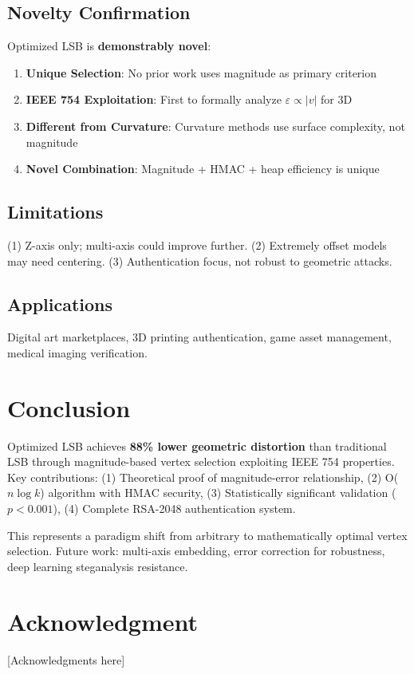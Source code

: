 \documentclass[conference]{IEEEtran}
\begin{document}
\subsection{Novelty Confirmation}
Optimized LSB is \textbf{demonstrably novel}:
\begin{enumerate}
\item \textbf{Unique Selection}: No prior work uses magnitude as primary criterion
\item \textbf{IEEE 754 Exploitation}: First to formally analyze $\varepsilon \propto |v|$ for 3D
\item \textbf{Different from Curvature}: Curvature methods \cite{zhou2019distortion} use surface complexity, not magnitude
\item \textbf{Novel Combination}: Magnitude + HMAC + heap efficiency is unique
\end{enumerate}

\subsection{Limitations}
(1) Z-axis only; multi-axis could improve further. (2) Extremely offset models may need centering. (3) Authentication focus, not robust to geometric attacks.

\subsection{Applications}
Digital art marketplaces, 3D printing authentication, game asset management, medical imaging verification.

\section{Conclusion}

Optimized LSB achieves \textbf{88\% lower geometric distortion} than traditional LSB through magnitude-based vertex selection exploiting IEEE 754 properties. Key contributions: (1) Theoretical proof of magnitude-error relationship, (2) O($n \log k$) algorithm with HMAC security, (3) Statistically significant validation ($p < 0.001$), (4) Complete RSA-2048 authentication system.

This represents a paradigm shift from arbitrary to mathematically optimal vertex selection. Future work: multi-axis embedding, error correction for robustness, deep learning steganalysis resistance.

\section*{Acknowledgment}
[Acknowledgments here]
\end{document}
